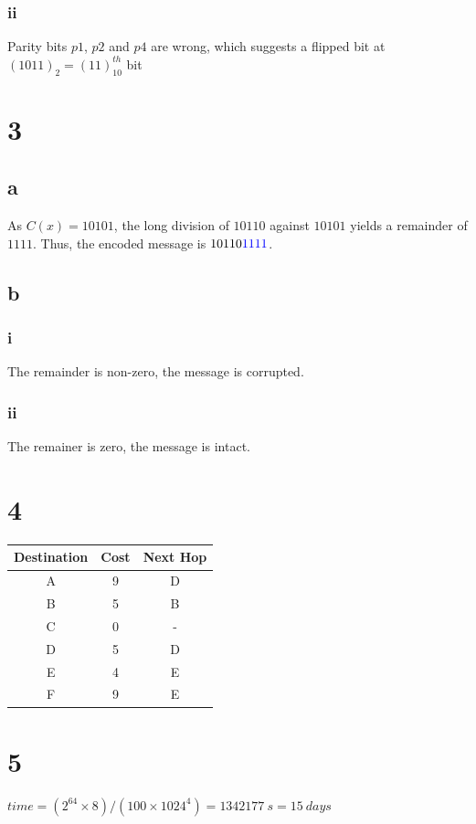\documentclass{report}
\begin{document}
      \subsubsection*{ii}
        Parity bits $p1$, $p2$ and $p4$ are wrong, which suggests a flipped bit at
        $(1011)_2 = (11)_{10}^{th}$ bit 
  
  \section*{3}
    \subsection*{a}
      As $C(x) = 10101$, the long division of $10110$ against $10101$ yields
      a remainder of $1111$. Thus, the encoded message is $10110{\color{blue}1111}$.
    \subsection*{b}
      \subsubsection*{i}
        The remainder is non-zero, the message is corrupted.
      \subsubsection*{ii}
        The remainer is zero, the message is intact.

  \section*{4}
    \begin{center}
      \begin{tabular}{|c|c|c|}
        \hline
        Destination&Cost&Next Hop \\
        \hline
        A&9&D \\
        \hline
        B&5&B \\
        \hline
        C&0&- \\
        \hline
        D&5&D \\
        \hline
        E&4&E \\
        \hline
        F&9&E \\
        \hline
      \end{tabular}
    \end{center}

  \section*{5}
    $time = (2^{64} \times 8)/(100 \times 1024^{4}) = 1342177\ s = 15\ days$
\end{document}
